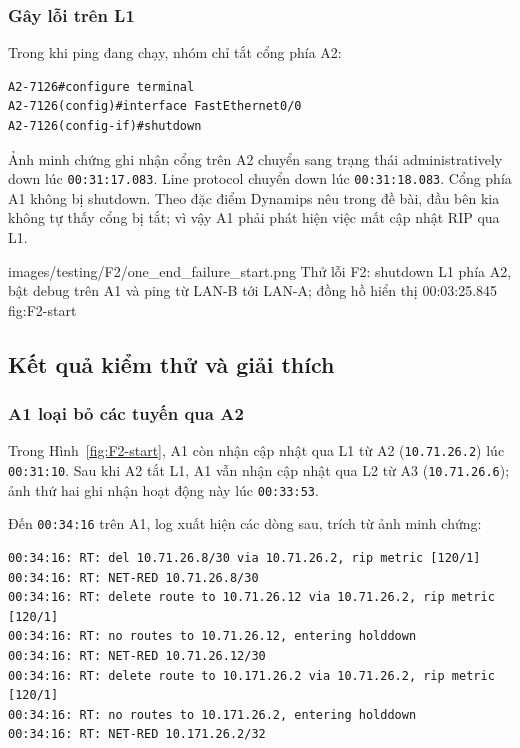 \subsubsection{Gây lỗi trên L1}

Trong khi ping đang chạy, nhóm chỉ tắt cổng phía A2:

\begin{lstlisting}
A2-7126#configure terminal
A2-7126(config)#interface FastEthernet0/0
A2-7126(config-if)#shutdown
\end{lstlisting}

Ảnh minh chứng ghi nhận cổng trên A2 chuyển sang
trạng thái administratively down lúc \texttt{00:31:17.083}.
Line protocol chuyển down lúc \texttt{00:31:18.083}.
Cổng phía A1 không bị shutdown.
Theo đặc điểm Dynamips nêu trong đề bài,
đầu bên kia không tự thấy cổng bị tắt; vì vậy A1 phải
phát hiện việc mất cập nhật RIP qua L1.

\partzeroimage
{images/testing/F2/one_end_failure_start.png}
{Thử lỗi F2: shutdown L1 phía A2, bật debug trên A1
và ping từ LAN-B tới LAN-A; đồng hồ hiển thị 00:03:25.845}
{fig:F2-start}

\subsection{Kết quả kiểm thử và giải thích}

\subsubsection{A1 loại bỏ các tuyến qua A2}

Trong Hình~\ref{fig:F2-start}, A1 còn nhận cập nhật qua L1
từ A2 (\texttt{10.71.26.2}) lúc \texttt{00:31:10}.
Sau khi A2 tắt L1, A1 vẫn nhận cập nhật qua L2
từ A3 (\texttt{10.71.26.6}); ảnh thứ hai ghi nhận
hoạt động này lúc \texttt{00:33:53}.

\noindent\begin{minipage}{\linewidth}
Đến \texttt{00:34:16} trên A1, log xuất hiện các dòng
sau, trích từ ảnh minh chứng:

\begin{lstlisting}
00:34:16: RT: del 10.71.26.8/30 via 10.71.26.2, rip metric [120/1]
00:34:16: RT: NET-RED 10.71.26.8/30
00:34:16: RT: delete route to 10.71.26.12 via 10.71.26.2, rip metric [120/1]
00:34:16: RT: no routes to 10.71.26.12, entering holddown
00:34:16: RT: NET-RED 10.71.26.12/30
00:34:16: RT: delete route to 10.171.26.2 via 10.71.26.2, rip metric [120/1]
00:34:16: RT: no routes to 10.171.26.2, entering holddown
00:34:16: RT: NET-RED 10.171.26.2/32
\end{lstlisting}
\end{minipage}

